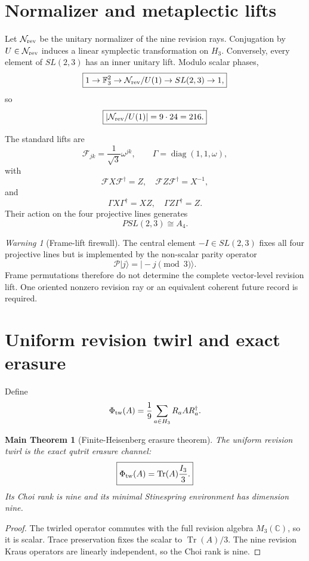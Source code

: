 \documentclass[11pt,oneside,openany]{book}
\numberwithin{equation}{chapter}
\newtheorem{maintheorem}[theorem]{Main Theorem}
\theoremstyle{definition}
\theoremstyle{remark}
\newtheorem{warning}[theorem]{Warning}
\newcommand{\C}{\mathbb C}
\newcommand{\Tr}{\operatorname{Tr}}
\newcommand{\diag}{\operatorname{diag}}
\begin{document}
\section{Normalizer and metaplectic lifts}

Let \(\mathcal N_{\rm rev}\) be the unitary normalizer of the nine revision
rays.  Conjugation by \(U\in\mathcal N_{\rm rev}\) induces a linear
symplectic transformation on \(H_3\).  Conversely, every element of
\(SL(2,3)\) has an inner unitary lift.  Modulo scalar phases,
\[
 \boxed{
 1\to\mathbb F_3^2
 \to\mathcal N_{\rm rev}/U(1)
 \to SL(2,3)\to1,}
\]
so
\[
 \boxed{|\mathcal N_{\rm rev}/U(1)|=9\cdot24=216.}
\]

The standard lifts are
\[
 \mathcal F_{jk}
 =
 \frac1{\sqrt3}\omega^{jk},
 \qquad
 \Gamma=\diag(1,1,\omega),
\]
with
\[
 \boxed{
 \mathcal FX\mathcal F^\dagger=Z,
 \quad
 \mathcal FZ\mathcal F^\dagger=X^{-1},}
\]
and
\[
 \boxed{
 \Gamma X\Gamma^\dagger=XZ,
 \quad
 \Gamma Z\Gamma^\dagger=Z.}
\]
Their action on the four projective lines generates
\[
 PSL(2,3)\cong A_4.
\]

\begin{warning}[Frame-lift firewall]
The central element \(-I\in SL(2,3)\) fixes all four projective lines but is
implemented by the non-scalar parity operator
\[
 \mathcal P|j\rangle=|-j\!\!\pmod3\rangle.
\]
Frame permutations therefore do not determine the complete vector-level
revision lift.  One oriented nonzero revision ray or an equivalent coherent
future record is required.
\end{warning}

\section{Uniform revision twirl and exact erasure}

Define
\[
 \Phi_{\rm tw}(A)
 =
 \frac19\sum_{a\in H_3}R_aAR_a^\dagger.
\]

\begin{maintheorem}[Finite-Heisenberg erasure theorem]
\label{thm:revision-erasure}
The uniform revision twirl is the exact qutrit erasure channel:
\[
 \boxed{
 \Phi_{\rm tw}(A)
 =
 \Tr(A)\frac{I_3}{3}.}
\]
Its Choi rank is nine and its minimal Stinespring environment has dimension
nine.
\end{maintheorem}

\begin{proof}
The twirled operator commutes with the full revision algebra
\(M_3(\C)\), so it is scalar.  Trace preservation fixes the scalar to
\(\Tr(A)/3\).  The nine revision Kraus operators are linearly independent,
so the Choi rank is nine.
\end{proof}
\end{document}
